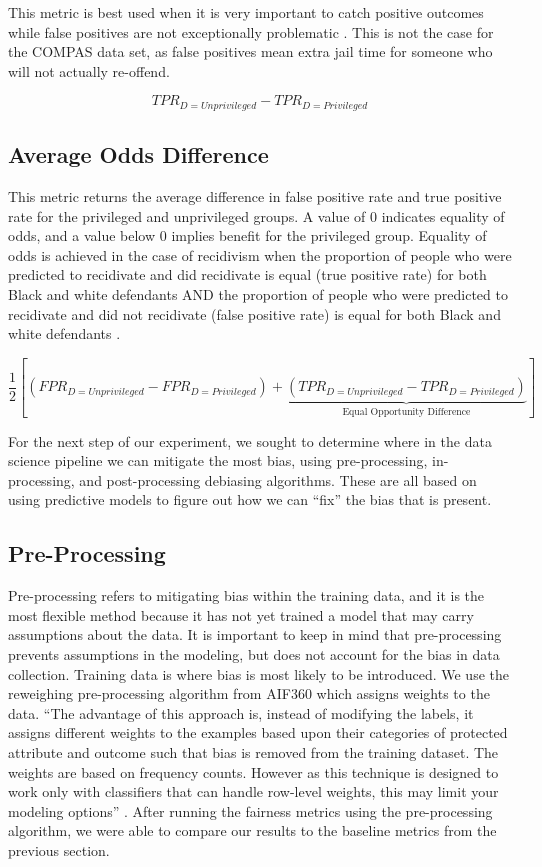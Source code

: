 \documentclass[water,article,submit,moreauthors,pdftex]{mdpi}
\begin{document}
This metric is best used when it is very important to catch positive
outcomes while false positives are not exceptionally problematic
\citep{Cortez2019How}. This is not the case for the COMPAS data set, as
false positives mean extra jail time for someone who will not actually
re-offend.

\[TPR_{D = Unprivileged} - TPR_{D = Privileged}\]

\hypertarget{average-odds-difference}{%
\subsection{Average Odds Difference}\label{average-odds-difference}}

This metric returns the average difference in false positive rate and
true positive rate for the privileged and unprivileged groups. A value
of 0 indicates equality of odds, and a value below 0 implies benefit for
the privileged group. Equality of odds is achieved in the case of
recidivism when the proportion of people who were predicted to
recidivate and did recidivate is equal (true positive rate) for both
Black and white defendants AND the proportion of people who were
predicted to recidivate and did not recidivate (false positive rate) is
equal for both Black and white defendants \citep{aif360-oct-2018}.

\[\frac{1}{2}\left[(FPR_{D = Unprivileged} - FPR_{D = Privileged}) + \underbrace{(TPR_{D = Unprivileged} - TPR_{D = Privileged})}_\textrm{Equal Opportunity Difference}\right]\]

For the next step of our experiment, we sought to determine where in the
data science pipeline we can mitigate the most bias, using
pre-processing, in-processing, and post-processing debiasing algorithms.
These are all based on using predictive models to figure out how we can
``fix'' the bias that is present.

\hypertarget{pre-processing}{%
\subsection{Pre-Processing}\label{pre-processing}}

Pre-processing refers to mitigating bias within the training data, and
it is the most flexible method because it has not yet trained a model
that may carry assumptions about the data. It is important to keep in
mind that pre-processing prevents assumptions in the modeling, but does
not account for the bias in data collection. Training data is where bias
is most likely to be introduced. We use the reweighing pre-processing
algorithm from AIF360 which assigns weights to the data. ``The advantage
of this approach is, instead of modifying the labels, it assigns
different weights to the examples based upon their categories of
protected attribute and outcome such that bias is removed from the
training dataset. The weights are based on frequency counts. However as
this technique is designed to work only with classifiers that can handle
row-level weights, this may limit your modeling options''
\citep{Ronaghan2019AI}. After running the fairness metrics using the
pre-processing algorithm, we were able to compare our results to the
baseline metrics from the previous section.
\end{document}
